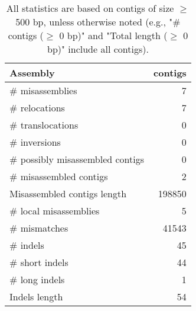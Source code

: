 \documentclass[12pt,a4paper]{article}
\begin{document}
\begin{table}[ht]
\begin{center}
\caption{All statistics are based on contigs of size $\geq$ 500 bp, unless otherwise noted (e.g., "\# contigs ($\geq$ 0 bp)" and "Total length ($\geq$ 0 bp)" include all contigs).}
\begin{tabular}{|l*{1}{|r}|}
\hline
Assembly & contigs \\ \hline
\# misassemblies & 7 \\ \hline
\hspace{5mm}\# relocations & 7 \\ \hline
\hspace{5mm}\# translocations & 0 \\ \hline
\hspace{5mm}\# inversions & 0 \\ \hline
\# possibly misassembled contigs & 0 \\ \hline
\# misassembled contigs & 2 \\ \hline
Misassembled contigs length & 198850 \\ \hline
\# local misassemblies & 5 \\ \hline
\# mismatches & 41543 \\ \hline
\# indels & 45 \\ \hline
\hspace{5mm}\# short indels & 44 \\ \hline
\hspace{5mm}\# long indels & 1 \\ \hline
Indels length & 54 \\ \hline
\end{tabular}
\end{center}
\end{table}
\end{document}
